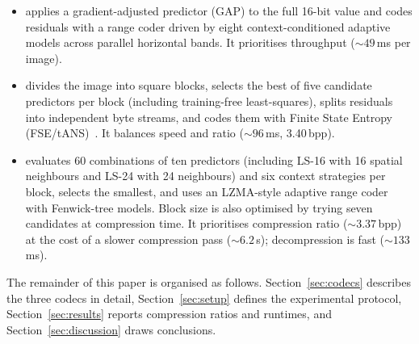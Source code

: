 \begin{itemize}
  \item \spdfocused{} applies a gradient-adjusted predictor (GAP) to
    the full 16-bit value and codes residuals with a range coder driven by
    eight context-conditioned adaptive models across parallel horizontal bands.
    It prioritises throughput (${\sim}49$\,ms per image).
  \item \allrounder{} divides the image into square blocks, selects the best
    of five candidate predictors per block (including training-free
    least-squares), splits residuals into independent byte streams, and codes
    them with Finite State Entropy (FSE/tANS)~\cite{collet2013fse}.
    It balances speed and ratio (${\sim}96$\,ms, 3.40\,bpp).
  \item \cmpfocused{} evaluates 60 combinations of ten predictors
    (including LS-16 with 16 spatial neighbours and LS-24 with 24 neighbours)
    and six context strategies per block, selects the smallest, and uses an
    LZMA-style adaptive range coder with Fenwick-tree models. Block size is
    also optimised by trying seven candidates at compression time.
    It prioritises compression ratio (${\sim}3.37$\,bpp) at the cost of a
    slower compression pass (${\sim}6.2$\,s); decompression is fast
    (${\sim}133$\,ms).
\end{itemize}

The remainder of this paper is organised as follows. Section~\ref{sec:codecs}
describes the three codecs in detail, Section~\ref{sec:setup} defines the
experimental protocol, Section~\ref{sec:results} reports compression ratios
and runtimes, and Section~\ref{sec:discussion} draws conclusions.
